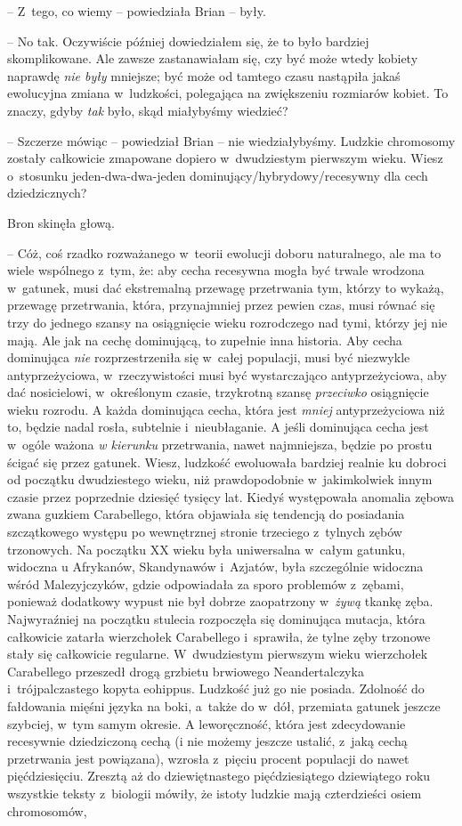\documentclass[oneside,polish,11pt,rmheadings]{mwbk}
\begin{document}
-- Z~tego, co wiemy -- powiedziała Brian -- były. 

-- No tak. Oczywiście później dowiedziałem się, że to było bardziej skomplikowane. Ale zawsze zastanawiałam się, czy być może wtedy kobiety naprawdę \textit{nie były }mniejsze; być może od tamtego czasu nastąpiła jakaś ewolucyjna zmiana w~ludzkości, polegająca na zwiększeniu rozmiarów kobiet. To znaczy, gdyby \textit{tak }było, skąd miałybyśmy wiedzieć? 

-- Szczerze mówiąc -- powiedział Brian -- nie wiedziałybyśmy. Ludzkie chromosomy zostały całkowicie zmapowane dopiero w~dwudziestym pierwszym wieku. Wiesz o~stosunku jeden-dwa-dwa-jeden dominujący/hybrydowy/recesywny dla cech dziedzicznych? 

Bron skinęła głową. 

-- Cóż, coś rzadko rozważanego w~teorii ewolucji doboru naturalnego, ale ma to wiele wspólnego z~tym, że: aby cecha recesywna mogła być trwale wrodzona w~gatunek, musi dać ekstremalną przewagę przetrwania tym, którzy to wykażą, przewagę przetrwania, która, przynajmniej przez pewien czas, musi równać się trzy do jednego szansy na osiągnięcie wieku rozrodczego nad tymi, którzy jej nie mają. Ale jak na cechę dominującą, to zupełnie inna historia. Aby cecha dominująca \textit{nie }rozprzestrzeniła się w~całej populacji, musi być niezwykle antyprzeżyciowa, w~rzeczywistości musi być wystarczająco antyprzeżyciowa, aby dać nosicielowi, w~określonym czasie, trzykrotną szansę \textit{przeciwko }osiągnięcie wieku rozrodu. A każda dominująca cecha, która jest \textit{mniej }antyprzeżyciowa niż to, będzie nadal rosła, subtelnie i~nieubłaganie. A jeśli dominująca cecha jest w~ogóle ważona \textit{w kierunku }przetrwania, nawet najmniejsza, będzie po prostu ścigać się przez gatunek. Wiesz, ludzkość ewoluowała bardziej realnie ku dobroci od początku dwudziestego wieku, niż prawdopodobnie w~jakimkolwiek innym czasie przez poprzednie dziesięć tysięcy lat. Kiedyś występowała anomalia zębowa zwana guzkiem Carabellego, która objawiała się tendencją do posiadania szczątkowego występu po wewnętrznej stronie trzeciego z~tylnych zębów trzonowych. Na początku XX wieku była uniwersalna w~całym gatunku, widoczna u Afrykanów, Skandynawów i~Azjatów, była szczególnie widoczna wśród Malezyjczyków, gdzie odpowiadała za sporo problemów z~zębami, ponieważ dodatkowy wypust nie był dobrze zaopatrzony w~\textit{żywą} tkankę zęba. Najwyraźniej na początku stulecia rozpoczęła się dominująca mutacja, która całkowicie zatarła wierzchołek Carabellego i~sprawiła, że tylne zęby trzonowe stały się całkowicie regularne. W~dwudziestym pierwszym wieku wierzchołek Carabellego przeszedł drogą grzbietu brwiowego Neandertalczyka i~trójpalczastego kopyta eohippus. Ludzkość już go nie posiada. Zdolność do fałdowania mięśni języka na boki, a~także do w~dół, przemiata gatunek jeszcze szybciej, w~tym samym okresie. A leworęczność, która jest zdecydowanie recesywnie dziedziczoną cechą (i nie możemy jeszcze ustalić, z~jaką cechą przetrwania jest powiązana), wzrosła z~pięciu procent populacji do nawet pięćdziesięciu. Zresztą aż do dziewiętnastego pięćdziesiątego dziewiątego roku wszystkie teksty z~biologii mówiły, że istoty ludzkie mają czterdzieści osiem chromosomów, 
\end{document}
